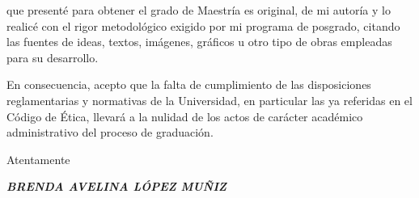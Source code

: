 \vspace{0.1cm}

\begin{sloppypar}
\noindent
que presenté para obtener el grado de Maestría es original, de mi autoría
y lo realicé con el rigor metodológico exigido por mi programa de
posgrado, citando las fuentes de ideas, textos, imágenes, gráficos u otro
tipo de obras empleadas para su desarrollo.

\noindent
En consecuencia, acepto que la falta de cumplimiento de las disposiciones
reglamentarias y normativas de la Universidad, en particular las ya
referidas en el Código de Ética, llevará a la nulidad de los actos de
carácter académico administrativo del proceso de graduación.
\end{sloppypar}

\vspace{0.4cm}

\begin{center}
    Atentamente

    \vspace{1.2cm}   %


    {\bfseries\itshape BRENDA AVELINA LÓPEZ MUÑIZ }
\end{center}

\endgroup
\clearpage
